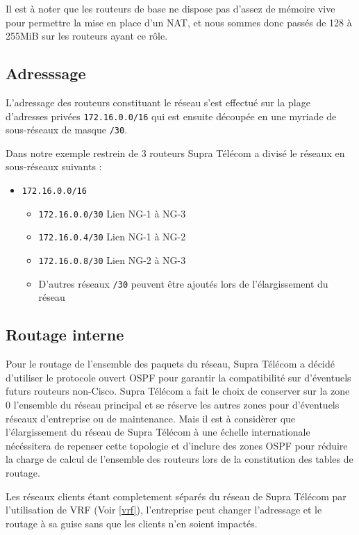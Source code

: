 \documentclass{article}
\newcommand{\spr}{Supra Télécom\xspace}
\begin{document}
Il est à noter que les routeurs de base ne dispose pas d'assez de mémoire vive pour permettre la mise en place d'un NAT, et nous sommes donc passés de 128 à 255MiB sur les routeurs ayant ce rôle.

\subsection{Adresssage}
\label{adressage}

L'adressage des routeurs constituant le réseau s'est effectué sur la plage d'adresses privées \texttt{172.16.0.0/16} qui est ensuite découpée en une myriade de sous-réseaux de masque \texttt{/30}.

Dans notre exemple restrein de 3 routeurs \spr a divisé le réseaux en sous-réseaux suivants :

\bigskip

\begin{itemize}
	\item \texttt{172.16.0.0/16}
	\begin{itemize}
		\item \texttt{172.16.0.0/30} Lien NG-1 à NG-3
		\item \texttt{172.16.0.4/30} Lien NG-1 à NG-2
		\item \texttt{172.16.0.8/30} Lien NG-2 à NG-3
		\item D'autres réseaux \texttt{/30} peuvent être ajoutés lors de l'élargissement du réseau
	\end{itemize}
\end{itemize}

\bigskip

\subsection{Routage interne}

Pour le routage de l'ensemble des paquets du réseau, \spr a décidé d'utiliser le protocole ouvert OSPF pour garantir la compatibilité sur d'éventuels futurs routeurs non-Cisco.
\spr a fait le choix de conserver sur la zone 0 l'ensemble du réseau principal et se réserve les autres zones pour d'éventuels réseaux d'entreprise ou de maintenance.
Mais il est à considèrer que l'élargissement du réseau de \spr à une échelle internationale nécéssitera de repenser cette topologie et d'inclure des zones OSPF pour réduire la charge de calcul de l'ensemble des routeurs lors de la constitution des tables de routage.

Les réseaux clients étant completement séparés du réseau de \spr par l'utilisation de VRF (Voir \ref{vrf}), l'entreprise peut changer l'adressage et le routage à sa guise sans que les clients n'en soient impactés.
\end{document}

